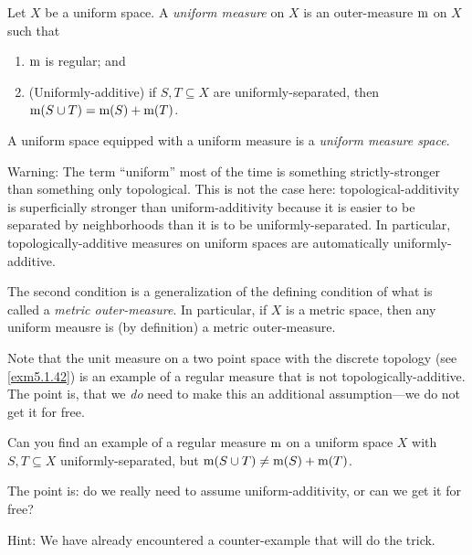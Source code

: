 \begin{dfn}\label{UniformMeasure}
Let $X$ be a uniform space.  A \emph{uniform measure} on $X$ is an outer-measure $\mathrm{m}$ on $X$ such that
\begin{enumerate}
\item $\mathrm{m}$ is regular; and
\item \label{UniformMeasure.ii}(Uniformly-additive) if $S,T\subseteq X$ are uniformly-separated, then $\mathrm{m} (S\cup T)=\mathrm{m} (S)+\mathrm{m} (T)$.
\end{enumerate}
A uniform space equipped with a uniform measure is a \emph{uniform measure space}.
\begin{rmk}
Warning:  The term ``uniform'' most of the time is something strictly-stronger than something only topological.  This is not the case here:  topological-additivity is superficially stronger than uniform-additivity because it is easier to be separated by neighborhoods than it is to be uniformly-separated.  In particular, topologically-additive measures on uniform spaces are automatically uniformly-additive.
\end{rmk}
\begin{rmk}
The second condition is a generalization of the defining condition of what is called a \emph{metric outer-measure}.  In particular, if $X$ is a metric space, then any uniform meausre is (by definition) a metric outer-measure.
\end{rmk}
\begin{rmk}
Note that the unit measure on a two point space with the discrete topology (see \cref{exm5.1.42}) is an example of a regular measure that is not topologically-additive.  The point is, that we \emph{do} need to make this an additional assumption---we do not get it for free.
\end{rmk}
\end{dfn}
\begin{exr}
Can you find an example of a regular measure $\mathrm{m}$ on a uniform space $X$ with $S,T\subseteq X$ uniformly-separated, but $\mathrm{m} (S\cup T)\neq \mathrm{m} (S)+\mathrm{m} (T)$.
\begin{rmk}
The point is:  do we really need to assume uniform-additivity, or can we get it for free?
\end{rmk}
\begin{rmk}
Hint:  We have already encountered a counter-example that will do the trick.
\end{rmk}
\end{exr}
